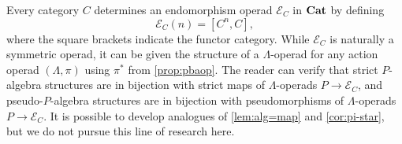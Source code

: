 \begin{rem}\label{rem:lop-alg-E}
Every category $C$ determines an endomorphism operad $\mathcal{E}_C$ in $\mathbf{Cat}$ by defining
\[
\mathcal{E}_C(n) = [C^n, C],
\]
where the square brackets indicate the functor category.
While $\mathcal{E}_C$ is naturally a symmetric operad, it can be given the structure of a $\Lambda$-operad for any action operad $(\Lambda, \pi)$ using $\pi^*$ from \cref{prop:pbaop}.
The reader can verify that strict $P$-algebra structures are in bijection with strict maps of $\Lambda$-operads $P \to \mathcal{E}_C$, and pseudo-$P$-algebra structures are in bijection with pseudomorphisms of $\Lambda$-operads $P \to \mathcal{E}_C$.
It is possible to develop analogues of \cref{lem:alg=map} and \cref{cor:pi-star}, but we do not pursue this line of research here.

%
%
\end{rem}

